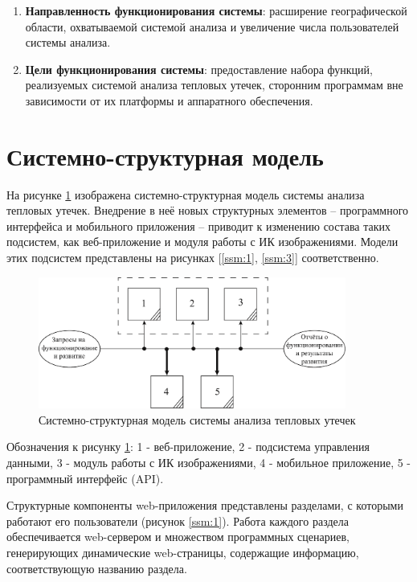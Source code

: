 \begin{enumerate}
	\item \textbf{Направленность функционирования системы}: расширение географической области, охватываемой системой анализа и увеличение числа пользователей системы анализа.

	\item \textbf{Цели функционирования системы}: предоставление набора функций, реализуемых системой анализа тепловых утечек, сторонним программам вне зависимости от их платформы и аппаратного обеспечения.

\end{enumerate}

\section{Системно-структурная модель}

\par 
	На рисунке \ref{ssm:0} изображена системно-структурная модель системы анализа тепловых утечек. Внедрение в неё новых структурных элементов -- программного интерфейса и мобильного приложения -- приводит к изменению состава таких подсистем, как веб-приложение и модуля работы с ИК изображениями. Модели этих подсистем представлены на рисунках [\ref{ssm:1}, \ref{ssm:3}] соответственно.

	 \begin{figure}[h!]
      \centering
      \includegraphics[width=0.9\textwidth]{images/ssm/0}
      \caption{Системно-структурная модель системы анализа тепловых утечек}
      \label{ssm:0}
    \end{figure}

\par 
	Обозначения к рисунку \ref{ssm:0}: 1 - веб-приложение, 2 - подсистема управления данными, 3 - модуль работы с ИК изображениями, 4 - мобильное приложение, 5 - программный интерфейс (API).

	Структурные компоненты web-приложения представлены разделами, с которыми работают его пользователи (рисунок \ref{ssm:1}). Работа каждого раздела обеспечивается web-сервером и множеством программных сценариев, генерирующих динамические web-страницы, содержащие информацию, соответствующую названию раздела.

